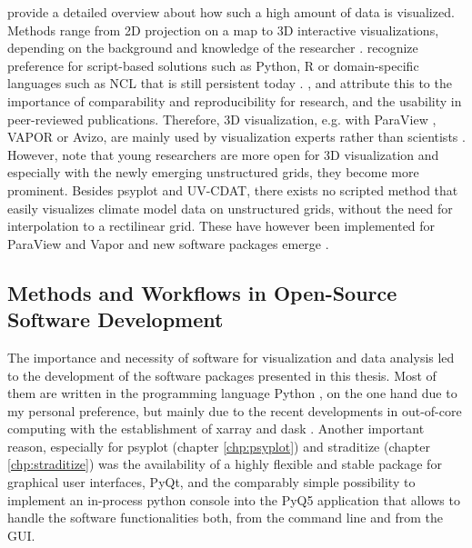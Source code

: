 \begin{refsection}
\cite{RautenhausBoettingerSiemenEtAl2018} provide a detailed overview about how such a high amount of data is visualized. Methods range from 2D projection on a map to 3D interactive visualizations, depending on the background and knowledge of the researcher \citep{Nocke2014}. \cite{NockeSterzelBoettingerEtAl2008} recognize preference for script-based solutions such as Python, R or domain-specific languages such as NCL \citep{BrownBrownriggHaleyEtAl2012} that is still persistent today \citep{RautenhausBoettingerSiemenEtAl2018}. \cite{Nocke2014}, \cite{SchulzNockeHeitzlerEtAl2013} and \cite{RautenhausBoettingerSiemenEtAl2018} attribute this to the importance of comparability and reproducibility for research, and the usability in peer-reviewed publications. Therefore, 3D visualization, e.g. with ParaView \citep{Ayachit2015}, VAPOR \citep{ClyneMininniNortonEtAl2007} or Avizo\addref, are mainly used by visualization experts rather than scientists \citep{NockeSterzelBoettingerEtAl2008}. However, \cite{Nocke2014} note that young researchers are more open for 3D visualization and especially with the newly emerging unstructured grids, they become more prominent. Besides psyplot \citep[chapter \ref{chp:psyplot}]{Sommer2017} and UV-CDAT\addref, there exists no scripted method that easily visualizes climate model data on unstructured grids, without the need for interpolation to a rectilinear grid. These have however been implemented for ParaView \citep{RoeberAdamidisBehrens2015} and Vapor \citep{JubairAlimRoeberEtAl2015} and new software packages emerge \cite[e.g.][]{SullivanTrainorGuitton2019, SullivanKaszynski2019}.


\subsection{Methods and Workflows in Open-Source Software Development} \label{sec:intro-software-tools}

The importance and necessity of software for visualization and data analysis led to the development of the software packages presented in this thesis. Most of them are written in the programming language Python \citep{PerezGrangerHunter2011}, on the one hand due to my personal preference, but mainly due to the recent developments in out-of-core computing with the establishment of xarray and dask \citep{HoyerHamman2017, DDT2016, Rocklin2015}. Another important reason, especially for psyplot (chapter \ref{chp:psyplot}) and straditize (chapter \ref{chp:straditize}) was the availability of a highly flexible and stable package for graphical user interfaces, PyQt\addref, and the comparably simple possibility to implement an in-process python console into the PyQ5 application  that allows to handle the software functionalities both, from the command line and from the GUI.


\end{refsection}
